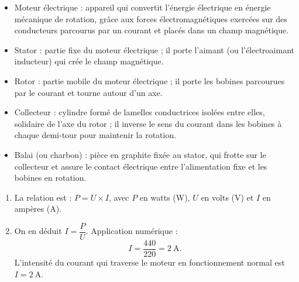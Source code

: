 \documentclass[11pt]{article}
\newcommand{\cle}[1]{{\popxbold\color{popdark}#1}}
\newcounter{popsec}
\newcounter{popsub}
\newcommand{\courssub}[1]{%
  \stepcounter{popsub}%
  \par\vspace{9pt}\noindent{\popxbold\fontsize{11.5}{13}\selectfont\color{popink}{\color{poporange}\thepopsec.\thepopsub}\hspace{6pt}#1}\par\nopagebreak\vspace{4pt}
}
\begin{document}
\begin{corrige}
\begin{itemize}
\item \cle{Moteur électrique} : appareil qui convertit l'énergie électrique en énergie mécanique de rotation, grâce aux forces électromagnétiques exercées sur des conducteurs parcourus par un courant et placés dans un champ magnétique.
\item \cle{Stator} : partie fixe du moteur électrique ; il porte l'aimant (ou l'électroaimant inducteur) qui crée le champ magnétique.
\item \cle{Rotor} : partie mobile du moteur électrique ; il porte les bobines parcourues par le courant et tourne autour d'un axe.
\item \cle{Collecteur} : cylindre formé de lamelles conductrices isolées entre elles, solidaire de l'axe du rotor ; il inverse le sens du courant dans les bobines à chaque demi-tour pour maintenir la rotation.
\item \cle{Balai} (ou charbon) : pièce en graphite fixée au stator, qui frotte sur le collecteur et assure le contact électrique entre l'alimentation fixe et les bobines en rotation.
\end{itemize}
\end{corrige}

\begin{corrige}
\begin{enumerate}
\item La relation est : $P = U \times I$, avec $P$ en watts (\si{W}), $U$ en volts (\si{V}) et $I$ en ampères (\si{A}).
\item On en déduit $I = \dfrac{P}{U}$. Application numérique :
\[ I = \frac{440}{220} = 2~\text{A}. \]
L'intensité du courant qui traverse le moteur en fonctionnement normal est $\boxed{I = 2~\text{A}}$.
\end{enumerate}
\end{corrige}

\courssub{Je m'entraîne}
\end{document}
